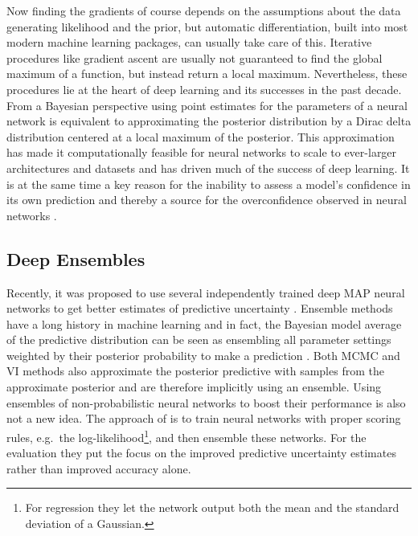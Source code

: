 \documentclass[../thesis.tex]{subfiles}
\begin{document}
Now finding the gradients of course depends on the assumptions about the data generating likelihood and the prior, but automatic differentiation, built into most modern machine learning packages, can usually take care of this. Iterative procedures like gradient ascent are usually not guaranteed to find the global maximum of a function, but instead return a local maximum. Nevertheless, these procedures lie at the heart of deep learning and its successes in the past decade. From a Bayesian perspective using point estimates for the parameters of a neural network is equivalent to approximating the posterior distribution by a Dirac delta distribution centered at a local maximum of the posterior. This approximation has made it computationally feasible for neural networks to scale to ever-larger architectures and datasets and has driven much of the success of deep learning. It is at the same time a key reason for the inability to assess a model's confidence in its own prediction and thereby a source for the overconfidence observed in neural networks \parencite{wilson2020case}.

\subsection{Deep Ensembles}
Recently, it was proposed to use several independently trained deep MAP neural networks to get better estimates of predictive uncertainty \parencite{lakshminarayanan2017simple}. Ensemble methods have a long history in machine learning and in fact, the Bayesian model average of the predictive distribution can be seen as ensembling all parameter settings weighted by their posterior probability to make a prediction \parencite{dietterich2000ensemble}. Both MCMC and VI methods also approximate the posterior predictive with samples from the approximate posterior and are therefore implicitly using an ensemble. Using ensembles of non-probabilistic neural networks to boost their performance is also not a new idea. The approach of \textcite{lakshminarayanan2017simple} is to train neural networks with proper scoring rules, e.g.\ the log-likelihood\footnote{For regression they let the network output both the mean and the standard deviation of a Gaussian.}, and then ensemble these networks. For the evaluation they put the focus on the improved predictive uncertainty estimates rather than improved accuracy alone.
\end{document}
